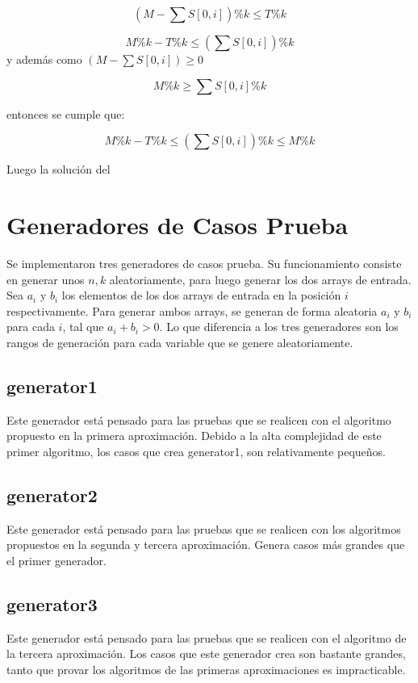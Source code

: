 \documentclass[article]{llncs}
\begin{document}
$$(M - \sum S[0, i])\% k \leq T\%k$$

$$M \%k - T\%k \leq (\sum S[0,i])\%k$$ 
y además como $(M - \sum S[0,i]) \geq 0$

$$M\%k \geq \sum S[0, i] \%k$$

entonces se cumple que: 

$$M\%k - T\% k \leq (\sum S[0,i])\%k \leq M \% k$$

Luego la solución del 

\section{Generadores de Casos Prueba}

Se implementaron tres generadores de casos prueba. Su funcionamiento 
consiste en generar unos $n,k$ aleatoriamente, para luego generar 
los dos arrays de entrada. Sea $a_i$ y $b_i$ los elementos de los dos arrays
de entrada en la posici\'on $i$ respectivamente. Para generar ambos arrays, 
se generan de forma aleatoria $a_i$ y $b_i$ para cada $i$, tal que 
$a_i + b_i > 0$.
Lo que diferencia a los tres generadores son los rangos de generaci\'on para 
cada variable que se genere aleatoriamente.

\subsection{generator1}
Este generador est\'a pensado para las pruebas que se realicen con el algoritmo 
propuesto en la primera aproximaci\'on. Debido a la alta complejidad de 
este primer algoritmo, los casos que crea generator1, son relativamente peque\~{n}os.

\subsection{generator2}
Este generador est\'a pensado para las pruebas que se realicen con los algoritmos 
propuestos en la segunda y tercera aproximaci\'on. Genera casos m\'as grandes 
que el primer generador.

\subsection{generator3}
Este generador est\'a pensado para las pruebas que se realicen con el 
algoritmo de la tercera aproximaci\'on. Los casos que este generador 
crea son bastante grandes, tanto que provar los algoritmos de las primeras 
aproximaciones es impracticable.
\end{document}
